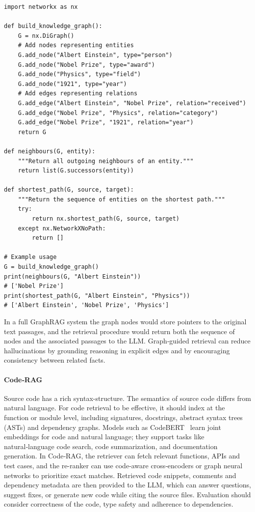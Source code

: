 \begin{listing}[!ht]
\begin{verbatim}
import networkx as nx

def build_knowledge_graph():
    G = nx.DiGraph()
    # Add nodes representing entities
    G.add_node("Albert Einstein", type="person")
    G.add_node("Nobel Prize", type="award")
    G.add_node("Physics", type="field")
    G.add_node("1921", type="year")
    # Add edges representing relations
    G.add_edge("Albert Einstein", "Nobel Prize", relation="received")
    G.add_edge("Nobel Prize", "Physics", relation="category")
    G.add_edge("Nobel Prize", "1921", relation="year")
    return G

def neighbours(G, entity):
    """Return all outgoing neighbours of an entity."""
    return list(G.successors(entity))

def shortest_path(G, source, target):
    """Return the sequence of entities on the shortest path."""
    try:
        return nx.shortest_path(G, source, target)
    except nx.NetworkXNoPath:
        return []

# Example usage
G = build_knowledge_graph()
print(neighbours(G, "Albert Einstein"))  
# ['Nobel Prize']
print(shortest_path(G, "Albert Einstein", "Physics"))  
# ['Albert Einstein', 'Nobel Prize', 'Physics']
\end{verbatim}
\caption{An Example of Graph-based Retrieval Primitives in Python}
\label{lst:graphrag}
\end{listing}

In a full GraphRAG system the graph nodes would store pointers to the original text passages, and the retrieval procedure would return both the sequence of nodes and the associated passages to the LLM.  Graph‑guided retrieval can reduce hallucinations by grounding reasoning in explicit edges and by encouraging consistency between related facts.

\paragraph{Code‑RAG}  Source code has a rich syntax-structure. The semantics of source code differs from natural language.  For code retrieval to be effective, it should index at the function or module level, including signatures, docstrings, abstract syntax trees (ASTs) and dependency graphs.  Models such as CodeBERT~\citep{feng2020codebert} learn joint embeddings for code and natural language; they support tasks like natural‑language code search, code summarization, and documentation generation.  In Code‑RAG, the retriever can fetch relevant functions, APIs and test cases, and the re-ranker can use code‑aware cross‑encoders or graph neural networks to prioritize exact matches.  Retrieved code snippets, comments and dependency metadata are then provided to the LLM, which can answer questions, suggest fixes, or generate new code while citing the source files.  Evaluation should consider correctness of the code, type safety and adherence to dependencies.


